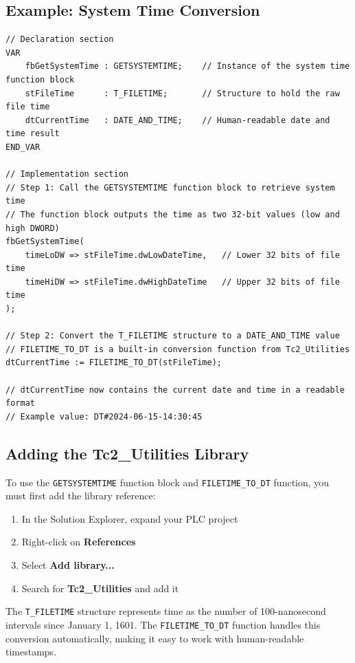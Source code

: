 \documentclass[11pt,a4paper]{article}
\begin{document}
\subsection*{Example: System Time Conversion}

\begin{lstlisting}
// Declaration section
VAR
    fbGetSystemTime : GETSYSTEMTIME;    // Instance of the system time function block
    stFileTime      : T_FILETIME;       // Structure to hold the raw file time
    dtCurrentTime   : DATE_AND_TIME;    // Human-readable date and time result
END_VAR

// Implementation section
// Step 1: Call the GETSYSTEMTIME function block to retrieve system time
// The function block outputs the time as two 32-bit values (low and high DWORD)
fbGetSystemTime(
    timeLoDW => stFileTime.dwLowDateTime,   // Lower 32 bits of file time
    timeHiDW => stFileTime.dwHighDateTime   // Upper 32 bits of file time
);

// Step 2: Convert the T_FILETIME structure to a DATE_AND_TIME value
// FILETIME_TO_DT is a built-in conversion function from Tc2_Utilities
dtCurrentTime := FILETIME_TO_DT(stFileTime);

// dtCurrentTime now contains the current date and time in a readable format
// Example value: DT#2024-06-15-14:30:45
\end{lstlisting}

\subsection{Adding the Tc2\_Utilities Library}

To use the \texttt{GETSYSTEMTIME} function block and \texttt{FILETIME\_TO\_DT} function, you must first add the library reference:

\begin{enumerate}
    \item In the Solution Explorer, expand your PLC project
    \item Right-click on \textbf{References}
    \item Select \textbf{Add library...}
    \item Search for \textbf{Tc2\_Utilities} and add it
\end{enumerate}

\begin{tipbox}
The \texttt{T\_FILETIME} structure represents time as the number of 100-nanosecond intervals since January 1, 1601. The \texttt{FILETIME\_TO\_DT} function handles this conversion automatically, making it easy to work with human-readable timestamps.
\end{tipbox}
\end{document}
